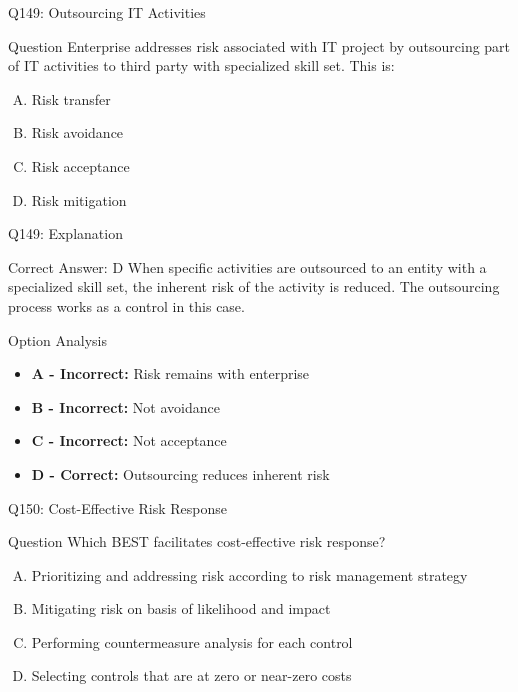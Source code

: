 \documentclass{beamer}
\begin{document}
	\begin{frame}{Q149: Outsourcing IT Activities}
		\begin{block}{Question}
			Enterprise addresses risk associated with IT project by outsourcing part of IT activities to third party with specialized skill set. This is:
		\end{block}
		\begin{enumerate}[(A)]
			\item Risk transfer
			\item Risk avoidance
			\item Risk acceptance
			\item Risk mitigation
		\end{enumerate}
	\end{frame}
	
	\begin{frame}{Q149: Explanation}
		\begin{block}{Correct Answer: D}
			When specific activities are outsourced to an entity with a specialized skill set, the inherent risk of the activity is reduced. The outsourcing process works as a control in this case.
		\end{block}
		\begin{block}{Option Analysis}
			\begin{itemize}
				\item \textbf{A - Incorrect:} Risk remains with enterprise
				\item \textbf{B - Incorrect:} Not avoidance
				\item \textbf{C - Incorrect:} Not acceptance
				\item \textbf{D - Correct:} Outsourcing reduces inherent risk
			\end{itemize}
		\end{block}
	\end{frame}
	
	\begin{frame}{Q150: Cost-Effective Risk Response}
		\begin{block}{Question}
			Which BEST facilitates cost-effective risk response?
		\end{block}
		\begin{enumerate}[(A)]
			\item Prioritizing and addressing risk according to risk management strategy
			\item Mitigating risk on basis of likelihood and impact
			\item Performing countermeasure analysis for each control
			\item Selecting controls that are at zero or near-zero costs
		\end{enumerate}
	\end{frame}
	
\end{document}
